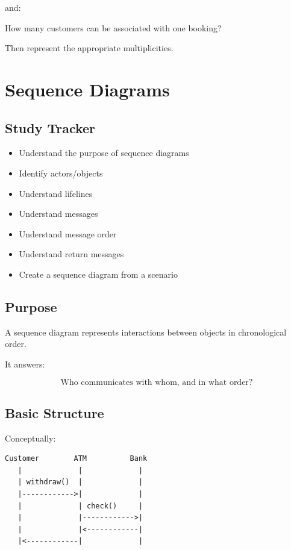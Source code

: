 \documentclass[11pt,a4paper]{article}
\newcommand{\checkitem}{$\square$}
\begin{document}
and:

\begin{center}
How many customers can be associated with one booking?
\end{center}

Then represent the appropriate multiplicities.

\section{Sequence Diagrams}

\subsection{Study Tracker}

\begin{itemize}[label=\checkitem]
    \item Understand the purpose of sequence diagrams
    \item Identify actors/objects
    \item Understand lifelines
    \item Understand messages
    \item Understand message order
    \item Understand return messages
    \item Create a sequence diagram from a scenario
\end{itemize}

\subsection{Purpose}

A sequence diagram represents interactions between objects in chronological
order.

It answers:

\[
\boxed{\text{Who communicates with whom, and in what order?}}
\]

\subsection{Basic Structure}

Conceptually:

\begin{verbatim}
Customer        ATM          Bank
   |             |             |
   | withdraw()  |             |
   |------------>|             |
   |             | check()     |
   |             |------------>|
   |             |<------------|
   |<------------|             |
\end{verbatim}
\end{document}
